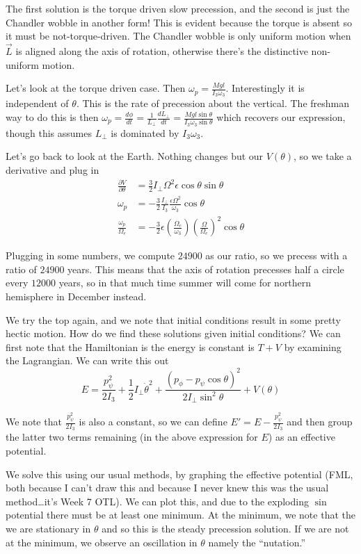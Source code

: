 \documentclass[10pt]{report}
\newcommand{\rd}[2]{\frac{d#1}{d#2}}
\newcommand{\pd}[2]{\frac{\partial #1}{\partial#2}}
\begin{document}
The first solution is the torque driven slow precession, and the second is just the Chandler wobble in another form! This is evident because the torque is absent so it must be not-torque-driven. The Chandler wobble is only uniform motion when $\vec{L}$ is aligned along the axis of rotation, otherwise there's the distinctive non-uniform motion.

Let's look at the torque driven case. Then $\omega_p = \frac{Mgl}{I_3 \omega_3}$. Interestingly it is independent of $\theta$. This is the rate of precession about the vertical. The freshman way to do this is then $\omega_p = \rd{\phi}{t} = \frac{1}{L_\perp}\rd{L_\perp}{t} = \frac{Mgl\sin \theta}{I_3 \omega_3 \sin \theta}$ which recovers our expression, though this assumes $L_{\perp}$ is dominated by $I_3 \omega_3$.

Let's go back to look at the Earth. Nothing changes but our $V(\theta)$, so we take a derivative and plug in
\begin{align*}
    \pd{V}{\theta} &= \frac{3}{2}I_\perp \Omega^2 \epsilon \cos \theta\sin\theta\\
    \omega_p &= -\frac{3}{2}\frac{I_{\perp}}{I_3} \frac{\epsilon\Omega^2}{\omega_3}\cos \theta\\
    \frac{\omega_p}{\Omega_e} &= -\frac{3}{2}\epsilon\left( \frac{\Omega_e}{\omega_3} \right)\left( \frac{\Omega}{\Omega_e} \right)^2\cos \theta
\end{align*}

Plugging in some numbers, we compute $24900$ as our ratio, so we precess with a ratio of $24900$ years. This means that the axis of rotation precesses half a circle every $12000$ years, so in that much time summer will come for northern hemisphere in December instead.

We try the top again, and we note that initial conditions result in some pretty hectic motion. How do we find these solutions given initial conditions? We can first note that the Hamiltonian is the energy is constant is $T+V$ by examining the Lagrangian. We can write this out
$$E=\frac{p_\psi^2}{2I_3} + \frac{1}{2}I_\perp \dot{\theta}^2 + \frac{(p_\phi - p_\psi\cos \theta)^2}{2I_\perp \sin^2 \theta} + V(\theta)$$

We note that $\frac{p_\psi^2}{2I_3}$ is also a constant, so we can define $E' = E-\frac{p_\psi^2}{2I_3}$ and then group the latter two terms remaining (in the above expression for $E$) as an effective potential.

We solve this using our usual methods, by graphing the effective potential (FML, both because I can't draw this and because I never knew this was the usual method\dots it's Week 7 OTL). We can plot this, and due to the exploding $\sin$ potential there must be at least one minimum. At the minimum, we note that the we are stationary in $\theta$ and so this is the steady precession solution. If we are not at the minimum, we observe an oscillation in $\theta$ namely the ``nutation.''
\end{document}
